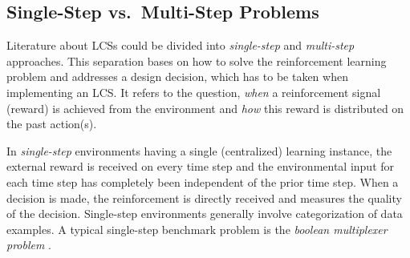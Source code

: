 
\subsection{Single-Step vs.\ Multi-Step Problems}
\label{subsection:single-step-vs-multi-step-problems}

Literature about LCSs could be divided into \emph{single-step} and \emph{mul\-ti-step} approaches. This separation bases on how to solve the reinforcement learning problem and addresses a design decision, which has to be taken when implementing an LCS. It refers to the question, \emph{when} a reinforcement signal (reward) is achieved from the environment and \emph{how} this reward is distributed on the past action(s). 

In \emph{single-step} environments having a single (centralized) learning instance, the external reward is received on every time step and the environmental input for each time step has completely been independent of the prior time step. %
When a decision is made, the reinforcement is directly received and measures the quality of the decision. Single-step environments generally involve categorization of data examples. A typical single-step benchmark problem is the \emph{boolean multiplexer problem} \cite{BKLW04,Wil95}. 

